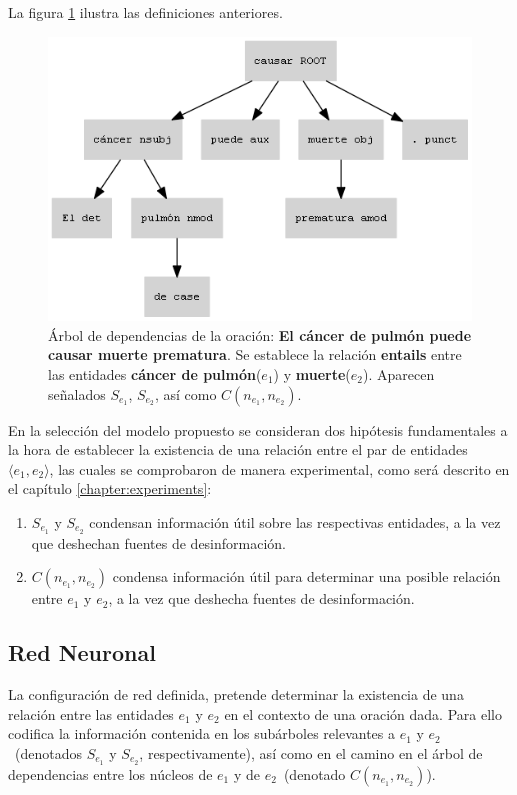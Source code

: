 La figura \ref{fig:dep_tree_ex} ilustra las definiciones anteriores.

\begin{figure}[h!]
	\centering
	\includegraphics[width=0.7\linewidth]{Graphics/dep_tree_ex.png}
	\caption{Árbol de dependencias de la oración: \textbf{El cáncer de pulmón puede causar muerte prematura}. Se establece la relación \textbf{entails} entre las entidades \textbf{cáncer de pulmón}($e_1$) y \textbf{muerte}($e_2$). Aparecen señalados $S_{e_1}$, $S_{e_2}$, así como $C(n_{e_1}, n_{e_2})$.}\label{fig:dep_tree_ex}
\end{figure}

En la selección del modelo propuesto se consideran dos hipótesis fundamentales a la hora de establecer la existencia de una relación entre el par de entidades $\langle e_1,e_2 \rangle$, las cuales se comprobaron de manera experimental, como será descrito en el capítulo \ref{chapter:experiments}:

\begin{enumerate}
	\item $S_{e_1}$ y $S_{e_2}$ condensan información útil sobre las respectivas entidades, a la vez que deshechan fuentes de desinformación.
	
	\item $C(n_{e_1}, n_{e_2})$ condensa información útil para determinar una posible relación entre $e_1$ y $e_2$, a la vez que deshecha fuentes de desinformación.
\end{enumerate}


\subsection{Red Neuronal}

La configuración de red definida, pretende determinar la existencia de una relación entre las entidades $e_1$ y $e_2$ en el contexto de una oración dada. Para ello codifica la información contenida en los subárboles relevantes a $e_1$ y $e_2$~(denotados $S_{e_1}$ y $S_{e_2}$, respectivamente), así como en el camino en el árbol de dependencias entre los núcleos de $e_1$ y de $e_2$~(denotado $C(n_{e_1}, n_{e_2})$).

